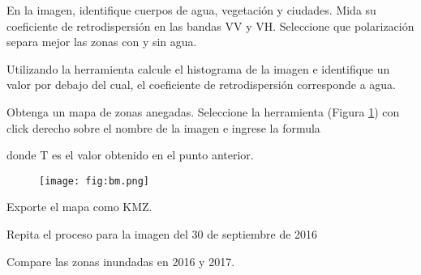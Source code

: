 \begin{que}
    En la imagen, identifique cuerpos de agua, vegetación y ciudades. Mida su coeficiente de retrodispersión en las bandas VV y VH. Seleccione que polarización separa mejor las zonas con y sin agua.
\end{que}

\begin{que}
    Utilizando la herramienta  calcule el histograma de la imagen e identifique un valor por debajo del cual, el coeficiente de retrodispersión corresponde a agua.
\end{que}

\begin{que}
    Obtenga un mapa de zonas anegadas. Seleccione la herramienta  (Figura \ref{fig:bm}) con click derecho sobre el nombre de la imagen e ingrese la formula
    \begin{center}
    \end{center}
    donde T es el valor obtenido en el punto anterior.
    \begin{figure}[h!]
        \centering
        \texttt{[image: fig:bm.png]}
        \caption{}
        \label{fig:bm}
    \end{figure}
\end{que}

\begin{que}
    Exporte el mapa como KMZ.
\end{que}

\begin{que}
    Repita el proceso para la imagen del 30 de septiembre de 2016
    \begin{center}
    \end{center}
\end{que}

\begin{que}
    Compare las zonas inundadas en 2016 y 2017.
\end{que}
